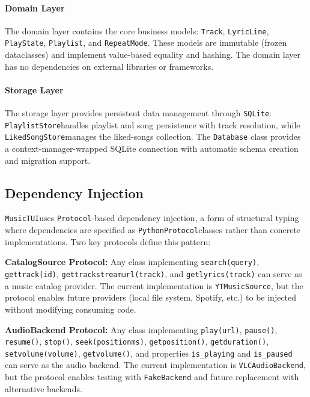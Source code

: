 \documentclass[a4paper,11pt,twoside]{article}
\newcommand{\py}{\texttt{Python}}
\newcommand{\sqlite}{\texttt{SQLite}}
\newcommand{\musictui}{\texttt{MusicTUI}}
\newcommand{\protocol}{\texttt{Protocol}}
\newcommand{\track}{\texttt{Track}}
\newcommand{\lyric}{\texttt{LyricLine}}
\newcommand{\playlist}{\texttt{Playlist}}
\newcommand{\playstate}{\texttt{PlayState}}
\newcommand{\repeatmode}{\texttt{RepeatMode}}
\newcommand{\playliststore}{\texttt{PlaylistStore}}
\newcommand{\likedsongstore}{\texttt{LikedSongStore}}
\newcommand{\ytmusicsource}{\texttt{YTMusicSource}}
\newcommand{\vlcaudiobackend}{\texttt{VLCAudioBackend}}
\DeclareRobustCommand{\method}[1]{\texttt{\def\_{\textunderscore\allowbreak}#1}}
\newcommand{\property}[1]{\texttt{#1}}
\begin{document}
\paragraph{Domain Layer}
The domain layer contains the core business models: \track, \lyric,
\playstate, \playlist, and \repeatmode. These models are immutable
(frozen dataclasses) and implement value-based equality and hashing. The
domain layer has no dependencies on external libraries or frameworks.

\paragraph{Storage Layer}
The storage layer provides persistent data management through \sqlite:
\playliststore handles playlist and song persistence with track resolution,
while \likedsongstore manages the liked-songs collection. The
\texttt{Database} class provides a context-manager-wrapped SQLite connection
with automatic schema creation and migration support.

\subsection{Dependency Injection}

\musictui uses \protocol-based dependency injection, a form of structural
typing where dependencies are specified as \py \protocol classes rather than
concrete implementations. Two key protocols define this pattern:

\begin{designbox}
\textbf{CatalogSource Protocol:} Any class implementing
\method{search(query)}, \method{get\_track(id)},
\method{get\_track\_stream\_url(track)}, and \method{get\_lyrics(track)}
can serve as a music catalog provider. The current implementation is
\ytmusicsource, but the protocol enables future providers (local file
system, Spotify, etc.) to be injected without modifying consuming code.
\end{designbox}

\begin{designbox}
\textbf{AudioBackend Protocol:} Any class implementing
\method{play(url)}, \method{pause()}, \method{resume()}, \method{stop()},
\method{seek(position\_ms)}, \method{get\_position()},
\method{get\_duration()}, \method{set\_volume(volume)},
\method{get\_volume()}, and properties \property{is\_playing} and
\property{is\_paused} can serve as the audio backend. The current
implementation is \vlcaudiobackend, but the protocol enables testing with
\texttt{FakeBackend} and future replacement with alternative backends.
\end{designbox}
\end{document}
